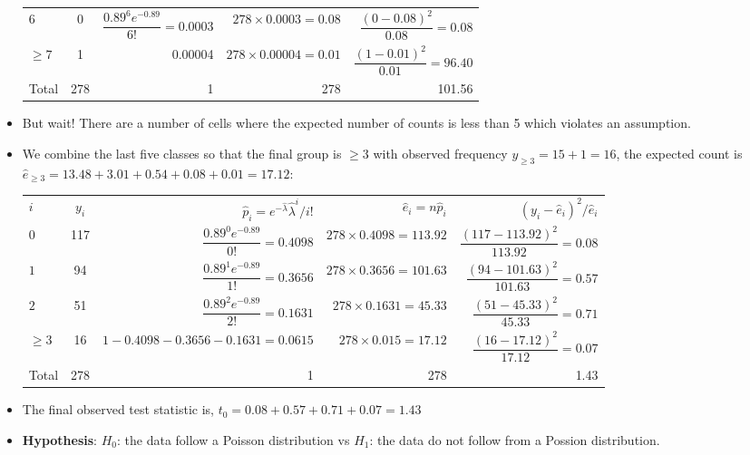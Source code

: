 \documentclass[a4paper]{article}\usepackage[]{graphicx}\usepackage[]{xcolor}
\begin{document}
\begin{itemize}
\begin{table}[H]
\begin{tabular}{@{}l|crrr@{}}
		\( 6 \) &    0     &  \( \dfrac{0.89^6 e^{-0.89}}{6!} = 0.0003 \)& \( 278 \times 0.0003 = 0.08 \) & \( \dfrac{(0-0.08)^2}{0.08} = 0.08 \)  \\ \addlinespace[0.5em]  
		\( \geq 7 \) &  1 &  0.00004 & \( 278 \times 0.00004 = 0.01 \) & \( \dfrac{(1 - 0.01)^2}{0.01}=   96.40 \) \\
		\midrule  
		Total &  278  & 1 & 278 & 101.56 \\ \bottomrule
		\end{tabular}
	\end{table}
	\item But wait! There are a number of cells where the expected number of counts is less than 5 which violates an assumption.
	\item We combine the last five classes so that the final group is \( \geq 3 \) with observed frequency \( y_{\geq 3} = 15+1 = 16 \), the expected count is \( \hat{e}_{\ge3} = 13.48+3.01+0.54+0.08+0.01 = 17.12 \):
	\begin{table}[H]
		\centering
		\begin{tabular}{@{}l|crrr@{}}
		\toprule
		\( i \) & \( y_i \) &  \( \hat p_i=e^{- \hat{\lambda}}\hat{\lambda}^i /i! \) & \( \hat{e}_i = n\hat{p}_i \) & \( (y_i-\hat{e}_{i})^2/\hat{e}_{i} \) \\ \addlinespace[0.5em]\midrule  
		\( 0 \) &  117 &  \( \dfrac{0.89^0 e^{-0.89}}{0!} = 0.4098 \) & \( 278 \times 0.4098 = 113.92 \) & \( \dfrac{(117-113.92)^2}{113.92} = 0.08 \)  \\ \addlinespace[0.5em]  
		\( 1 \) &  94  &  \( \dfrac{0.89^1 e^{-0.89}}{1!} = 0.3656 \) & \( 278 \times 0.3656 = 101.63 \) & \( \dfrac{(94-101.63)^2}{101.63} = 0.57 \)    \\ \addlinespace[0.5em] 
		\( 2 \) &  51  &  \( \dfrac{0.89^2 e^{-0.89}}{2!} = 0.1631 \) & \( 278 \times 0.1631 = 45.33 \) & \( \dfrac{(51-45.33)^2}{45.33} = 0.71 \)  \\ \addlinespace[0.5em]
		\( \geq 3 \) & 16 & \( 1-0.4098-0.3656-0.1631 = 0.0615 \) & \( 278 \times 0.015 = 17.12 \) & \( \dfrac{(16 - 17.12)^2}{17.12} = 0.07 \) \\ \midrule
		Total &  278  & 1 & 278 & 1.43 \\ \bottomrule
		\end{tabular}
	\end{table}
	\item The final observed test statistic is, \( t_0 = 0.08 + 0.57 + 0.71 + 0.07 = 1.43 \) 
	\item \textbf{Hypothesis}: \( H_0 \): the data follow a Poisson distribution vs \( H_1 \): the data do not follow from a Possion distribution.

\end{itemize}
\end{document}
